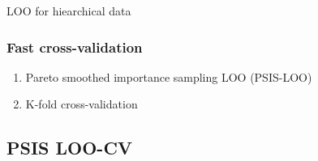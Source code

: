 \documentclass[10pt]{beamer}
\begin{document}
\begin{frame}{LOO for hiearchical data}
  \\

\end{frame}


\begin{frame}{}

\frametitle{Fast cross-validation}

\begin{enumerate}
\item Pareto smoothed importance sampling LOO (PSIS-LOO)
\pause
\item K-fold cross-validation
\end{enumerate}

\vspace{12\baselineskip}


\end{frame}

\subsection{PSIS LOO-CV}
\frame{\subsectionpage}
\end{document}
